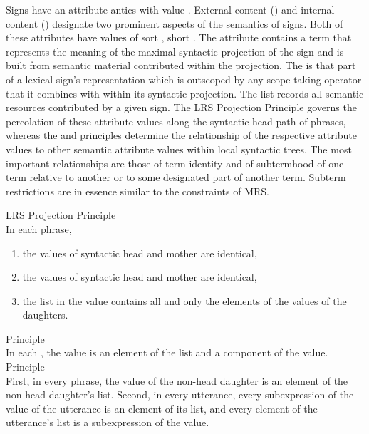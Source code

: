 \documentclass[output=paper]{langsci/langscibook}
\begin{document}
Signs have an attribute antics with value
. External content () and internal content
() designate two prominent aspects of the semantics of
signs. Both of these attributes have
values of sort , short
. The attribute  contains a term
that represents the meaning of the maximal syntactic projection of the sign
and is built from semantic material contributed within the projection. The
 is that part of a lexical sign's representation which is
outscoped by any scope-taking operator that it combines with within
its syntactic projection. The  list records all semantic
resources contributed by a given sign. The LRS Projection Principle
governs the percolation of these attribute values along the syntactic
head path of phrases, whereas the  and 
principles determine the relationship of the respective attribute
values to other semantic attribute values within local syntactic
trees. The most important relationships are those of term identity and
of subtermhood of one term relative to another or to some designated part
of another term. Subterm restrictions are in essence similar
to the  constraints of MRS.

\begin{exe}
  \ex\label{lrs-essent-principles}
  \begin{xlist}
    \ex\label{lrs-projection} LRS Projection Principle\\
    In each phrase,
    \begin{enumerate}
    \item the  values of syntactic head and mother are identical,
    \item the  values of syntactic head and mother are identical,
    \item the list in the  value contains all and only the elements
    of the  values of the daughters.
    \end{enumerate}
    \ex\label{lrs-incont}  Principle\\
    In each , the  value is an element of the
     list and a component of the  value.
    \ex\label{lrs-excont}  Principle\\
    First, in every phrase, the  value of the non-head daughter
    is an element of the non-head daughter's  list. Second, in
    every utterance, every subexpression of the  value of the
    utterance is an element of its  list, and every element of
    the utterance's  list is a subexpression of the 
    value.
  \end{xlist}
\end{exe}
\end{document}
